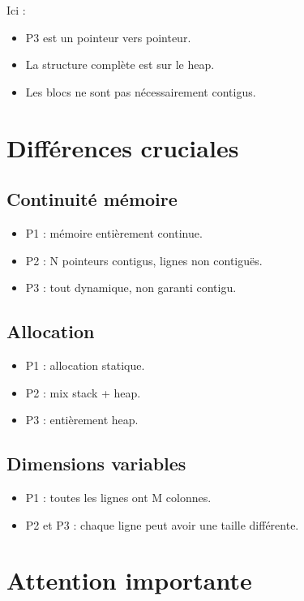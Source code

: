 Ici :

\begin{itemize}
\item P3 est un pointeur vers pointeur.
\item La structure complète est sur le heap.
\item Les blocs ne sont pas nécessairement contigus.
\end{itemize}

\section{Différences cruciales}

\subsection{Continuité mémoire}

\begin{itemize}
\item P1 : mémoire entièrement continue.
\item P2 : N pointeurs contigus, lignes non contiguës.
\item P3 : tout dynamique, non garanti contigu.
\end{itemize}

\subsection{Allocation}

\begin{itemize}
\item P1 : allocation statique.
\item P2 : mix stack + heap.
\item P3 : entièrement heap.
\end{itemize}

\subsection{Dimensions variables}

\begin{itemize}
\item P1 : toutes les lignes ont M colonnes.
\item P2 et P3 : chaque ligne peut avoir une taille différente.
\end{itemize}

\section{Attention importante}

